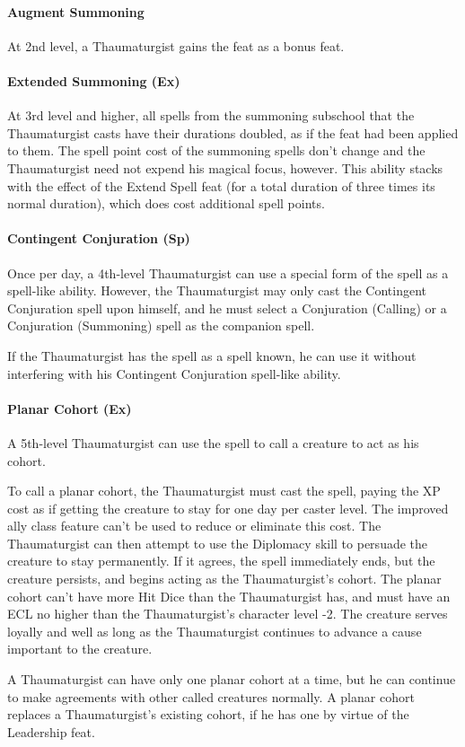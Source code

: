 \paragraph{Augment Summoning}
At 2nd level, a Thaumaturgist gains the  feat as a bonus feat.

\paragraph{Extended Summoning (Ex)}
At 3rd level and higher, all spells from the summoning subschool that the Thaumaturgist casts have their durations doubled, as if the  feat had been applied to them. 
The spell point cost of the summoning spells don't change and the Thaumaturgist need not expend his magical focus, however. 
This ability stacks with the effect of the Extend Spell feat (for a total duration of three times its normal duration), which does cost additional spell points.

\paragraph{Contingent Conjuration (Sp)}
Once per day, a 4th-level Thaumaturgist can use a special form of the  spell as a spell-like ability. However, the Thaumaturgist may only cast the Contingent Conjuration spell upon himself, and he must select a Conjuration (Calling) or a Conjuration (Summoning) spell as the companion spell.

If the Thaumaturgist has the  spell as a spell known, he can use it without interfering with his Contingent Conjuration spell-like ability.
\paragraph{Planar Cohort (Ex)}
A 5th-level Thaumaturgist can use the  spell to call a creature to act as his cohort. 

To call a planar cohort, the Thaumaturgist must cast the spell, paying the XP cost as if getting the creature to stay for one day per caster level. The improved ally class feature can't be used to reduce or eliminate this cost. 
The Thaumaturgist can then attempt to use the Diplomacy skill to persuade the creature to stay permanently. 
If it agrees, the  spell immediately ends, but the creature persists, and begins acting as the Thaumaturgist's cohort.
The planar cohort can't have more Hit Dice than the Thaumaturgist has, and must have an ECL no higher than the Thaumaturgist's character level -2.
The creature serves loyally and well as long as the Thaumaturgist continues to advance a cause important to the creature.

A Thaumaturgist can have only one planar cohort at a time, but he can continue to make agreements with other called creatures normally. 
A planar cohort replaces a Thaumaturgist's existing cohort, if he has one by virtue of the Leadership feat.